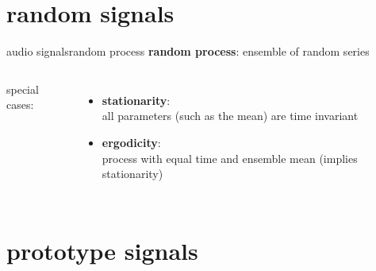\section{random signals}	
\begin{frame}{audio signals}{random process}
	\textbf{random process}: ensemble of random series
    \begin{columns}
    \vspace{-5mm}
	special cases:
	\begin{itemize}
		\item	\textbf{stationarity}:\\ all parameters (such as the mean) are time invariant
		\bigskip
        \item	\textbf{ergodicity}:\\ process with equal time and ensemble mean (implies stationarity)
	\end{itemize}
    \end{columns}
\end{frame}

\section{prototype signals}

